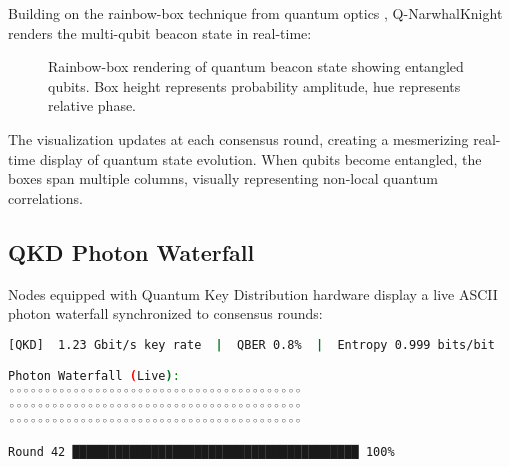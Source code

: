 \documentclass[12pt,a4paper]{article}
\begin{document}
Building on the rainbow-box technique from quantum optics \cite{lamy2019quantum}, Q-NarwhalKnight renders the multi-qubit beacon state in real-time:

\begin{figure}[H]
\centering
{}
\caption{Rainbow-box rendering of quantum beacon state showing entangled qubits. Box height represents probability amplitude, hue represents relative phase.}
\label{fig:rainbow-box}
\end{figure}

The visualization updates at each consensus round, creating a mesmerizing real-time display of quantum state evolution. When qubits become entangled, the boxes span multiple columns, visually representing non-local quantum correlations.

\subsection{QKD Photon Waterfall}

Nodes equipped with Quantum Key Distribution hardware display a live ASCII photon waterfall synchronized to consensus rounds:

\begin{lstlisting}[language=bash,caption=Live QKD Visualization Output]
[QKD]  1.23 Gbit/s key rate  |  QBER 0.8%  |  Entropy 0.999 bits/bit

Photon Waterfall (Live):
◦◦◦◦◦◦◦◦◦◦◦◦◦◦◦◦◦◦◦◦◦◦◦◦◦◦◦◦◦◦◦◦◦◦◦◦◦◦◦◦◦
◦◦◦◦◦◦◦◦◦◦◦◦◦◦◦◦◦◦◦◦◦◦◦◦◦◦◦◦◦◦◦◦◦◦◦◦◦◦◦◦◦
◦◦◦◦◦◦◦◦◦◦◦◦◦◦◦◦◦◦◦◦◦◦◦◦◦◦◦◦◦◦◦◦◦◦◦◦◦◦◦◦◦

Round 42 ████████████████████████████████████████ 100%
\end{lstlisting}
\end{document}
